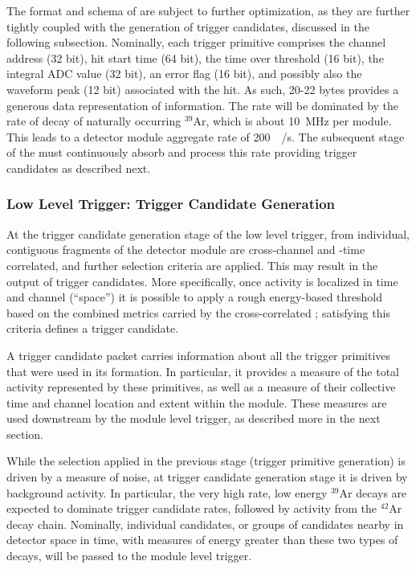The format and schema of  are subject to further
optimization, as they are further tightly coupled with the generation of trigger
candidates, discussed in the following subsection.
Nominally, each trigger primitive comprises the channel address (32 bit), hit
start time (64 bit), the time over threshold (16 bit), the integral ADC value
(32 bit), an error flag (16 bit), and possibly also the waveform peak (12 bit)
associated with the hit. 
As such, 20-22 bytes provides a generous data representation of
 information. 
The  rate will be dominated by the rate of decay of
naturally occurring $^{39}$Ar, which is about \SI{10}{\mega\hertz} per module.
This leads to a detector module aggregate rate of \SI{200}{\mega\byte/\second}.
The subsequent stage of the  must continuously absorb and process
this rate providing trigger candidates as described next.

\subsubsection{Low Level Trigger: Trigger Candidate Generation}

At the trigger candidate generation stage of the low level trigger,
 from individual, contiguous fragments of the detector
module are cross-channel and -time correlated, and further selection criteria
are applied.
This may result in the output of trigger candidates. 
More specifically, once activity is localized in time and channel (``space'') it
is possible to apply a rough energy-based threshold based on the combined
metrics carried by the cross-correlated ; satisfying this
criteria defines a trigger candidate. 

A trigger candidate packet carries information about all the trigger
primitives that were used in its formation. 
In particular, it provides a measure of the total activity represented
by these primitives, as well as a measure of their collective time and channel
location and extent within the module.
These measures are used downstream by the module level trigger, 
as described more in the next section.

While the selection applied in the previous stage (trigger primitive generation)
is driven by a measure of noise, at trigger candidate generation stage it is
driven by background activity.  
In particular, the very high rate, low energy $^{39}$Ar decays are expected to
dominate trigger candidate rates, followed by activity from the $^{42}$Ar decay
chain.
Nominally, individual candidates, or groups of candidates nearby in detector
space in time, with measures of energy greater than these two types of decays,
will be passed to the module level trigger. 

